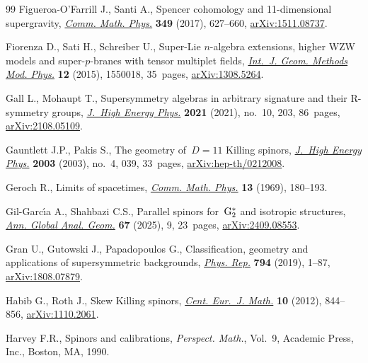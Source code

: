 \documentclass[pdftex]{sigma}
\numberwithin{equation}{section}
\newcommand{\1}{\mathbbm{1}}
\begin{document}
\begin{thebibliography}{99}
Figueroa-O'Farrill J., Santi A., Spencer cohomology and 11-dimensional
 supergravity, \href{https://doi.org/10.1007/s00220-016-2700-1}{\textit{Comm.
 Math. Phys.}} \textbf{349} (2017), 627--660,
 \href{http://arxiv.org/abs/1511.08737}{arXiv:1511.08737}.

Fiorenza D., Sati H., Schreiber U., Super-{L}ie {$n$}-algebra extensions,
 higher {WZW} models and super-{$p$}-branes with tensor multiplet fields,
 \href{https://doi.org/10.1142/S0219887815500188}{\textit{Int.~J. Geom.
 Methods Mod. Phys.}} \textbf{12} (2015), 1550018, 35~pages,
 \href{http://arxiv.org/abs/1308.5264}{arXiv:1308.5264}.

Gall L., Mohaupt T., Supersymmetry algebras in arbitrary signature and their
 {R}-symmetry groups,
 \href{https://doi.org/10.1007/jhep10(2021)203}{\textit{J.~High Energy Phys.}}
 \textbf{2021} (2021), no.~10, 203, 86~pages,
 \href{http://arxiv.org/abs/2108.05109}{arXiv:2108.05109}.

Gauntlett J.P., Pakis S., The geometry of~{$D=11$} {K}illing spinors,
 \href{https://doi.org/10.1088/1126-6708/2003/04/039}{\textit{J.~High Energy
 Phys.}} \textbf{2003} (2003), no.~4, 039, 33~pages,
 \href{http://arxiv.org/abs/hep-th/0212008}{arXiv:hep-th/0212008}.

Geroch R., Limits of spacetimes,
 \href{https://doi.org/10.1007/BF01645486}{\textit{Comm. Math. Phys.}}
 \textbf{13} (1969), 180--193.

Gil-Garc\'{\i}a A., Shahbazi C.S., Parallel spinors for~{${\rm G}_2^*$} and
 isotropic structures,
 \href{https://doi.org/10.1007/s10455-025-09987-y}{\textit{Ann. Global Anal.
 Geom.}} \textbf{67} (2025), 9, 23~pages,
 \href{http://arxiv.org/abs/2409.08553}{arXiv:2409.08553}.

Gran U., Gutowski J., Papadopoulos G., Classification, geometry and
 applications of supersymmetric backgrounds,
 \href{https://doi.org/10.1016/j.physrep.2018.11.005}{\textit{Phys. Rep.}}
 \textbf{794} (2019), 1--87,
 \href{http://arxiv.org/abs/1808.07879}{arXiv:1808.07879}.

Habib G., Roth J., Skew {K}illing spinors,
 \href{https://doi.org/10.2478/s11533-012-0029-3}{\textit{Cent. Eur.~J.
 Math.}} \textbf{10} (2012), 844--856,
 \href{http://arxiv.org/abs/1110.2061}{arXiv:1110.2061}.

Harvey F.R., Spinors and calibrations, \textit{Perspect. Math.}, Vol.~9,
 Academic Press, Inc., Boston, MA, 1990.


\end{thebibliography}
\end{document}
